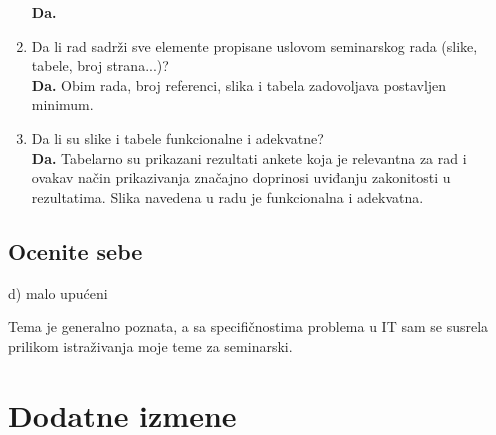 \documentclass[a4paper]{report}
\begin{document}
\begin{enumerate}
\textbf{Da.}

\item Da li rad sadrži sve elemente propisane uslovom seminarskog rada (slike, tabele, broj strana...)?\\

\textbf{Da.} Obim rada, broj referenci, slika i tabela zadovoljava postavljen minimum. 

\item Da li su slike i tabele funkcionalne i adekvatne?\\

\textbf{Da.} Tabelarno su prikazani rezultati ankete koja je relevantna za rad i ovakav način prikazivanja značajno doprinosi uviđanju zakonitosti u rezultatima. Slika navedena u radu je funkcionalna i adekvatna.
\end{enumerate}

\section{Ocenite sebe}
d) malo upućeni

Tema je generalno poznata, a sa specifičnostima problema u IT sam se susrela prilikom istraživanja moje teme za seminarski.


\chapter{Dodatne izmene}
\end{document}
